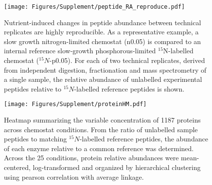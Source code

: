 \documentclass[12pt]{article}\usepackage{graphicx, color}
\begin{document}
\begin{figure}[h!]
\texttt{[image: Figures/Supplement/peptide\_RA\_reproduce.pdf]}
\caption{Nutrient-induced changes in peptide abundance between technical replicates are highly reproducible.  As a representative example, a slow growth nitrogen-limited chemostat (n0.05) is compared to an internal reference slow-growth phosphorous-limited $^{15}$N-labelled chemostat ($^{15}N$-p0.05).  For each of two technical replicates, derived from independent digestion, fractionation and mass spectrometry of a single sample, the relative abundance of unlabelled experimental peptides relative to $^{15}N$-labelled reference peptides is shown.}
\label{fig:proteomicsConsistency}
\end{figure}

\begin{figure}[h!]
\texttt{[image: Figures/Supplement/proteinHM.pdf]}
\caption{Heatmap summarizing the variable concentration of 1187 proteins across chemostat conditions. From the ratio of unlabelled sample peptides to matching $^{15}N$-labelled reference peptides, the abundance of each enzyme relative to a common reference was determined.  Across the 25 conditions, protein relative abundances were mean-centered, log-transformed and organized by hierarchical clustering using pearson correlation with average linkage.}
\label{fig:proteinHM}
\end{figure}

\end{document}
